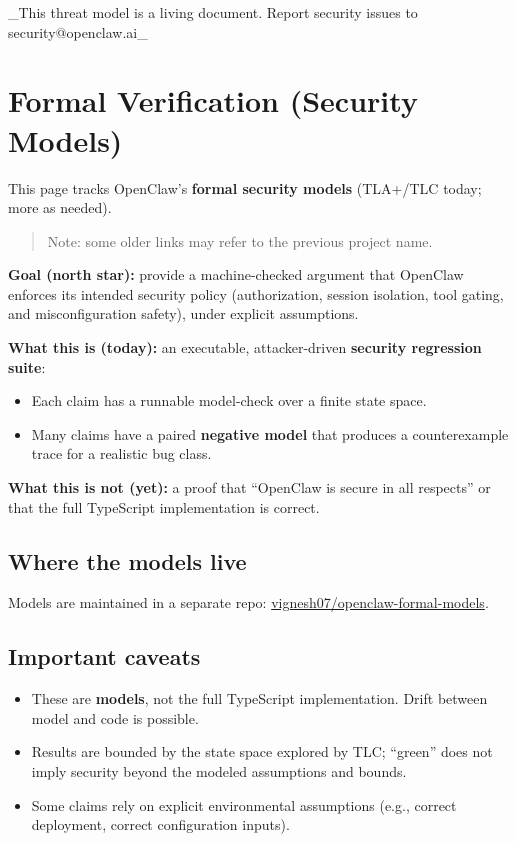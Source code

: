 \hrulefill


\_This threat model is a living document. Report security issues to security@openclaw.ai\_


\clearpage

\section{Formal Verification (Security Models)}


This page tracks OpenClaw’s \textbf{formal security models} (TLA+/TLC today; more as needed).

\begin{quote}
Note: some older links may refer to the previous project name.
\end{quote}


\textbf{Goal (north star):} provide a machine-checked argument that OpenClaw enforces its
intended security policy (authorization, session isolation, tool gating, and
misconfiguration safety), under explicit assumptions.

\textbf{What this is (today):} an executable, attacker-driven \textbf{security regression suite}:

\begin{itemize}
  \item Each claim has a runnable model-check over a finite state space.
  \item Many claims have a paired \textbf{negative model} that produces a counterexample trace for a realistic bug class.
\end{itemize}


\textbf{What this is not (yet):} a proof that “OpenClaw is secure in all respects” or that the full TypeScript implementation is correct.

\subsection{Where the models live}


Models are maintained in a separate repo: \href{https://github.com/vignesh07/openclaw-formal-models}{vignesh07/openclaw-formal-models}.

\subsection{Important caveats}


\begin{itemize}
  \item These are \textbf{models}, not the full TypeScript implementation. Drift between model and code is possible.
  \item Results are bounded by the state space explored by TLC; “green” does not imply security beyond the modeled assumptions and bounds.
  \item Some claims rely on explicit environmental assumptions (e.g., correct deployment, correct configuration inputs).
\end{itemize}


